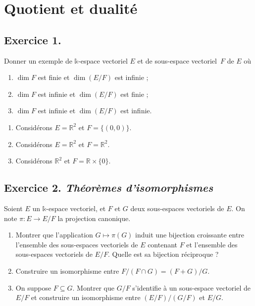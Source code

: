 \documentclass[./main]{subfiles}
\begin{document}
  \chapter{Quotient et dualité}
  \minitoc

  \section{Exercice 1.}
  \begin{enonce}
    Donner un exemple de $\mathds{k}$-espace vectoriel $E$ et de sous-espace vectoriel~$F$ de $E$ où
    \begin{enumerate}
      \item $\dim F$ est finie et  $\dim(E / F)$ est infinie ;
      \item $\dim F$ est infinie et  $\dim(E / F)$ est finie ;
      \item $\dim F$ est infinie et  $\dim(E / F)$ est infinie.
    \end{enumerate}
  \end{enonce}
  \begin{enumerate}
    \item Considérons $E = \mathds{R}^2$ et $F = \{(0,0)\}$.
    \item Considérons $E = \mathds{R}^2$ et $F = \mathds{R}^2$.
    \item Considérons $\mathds{R}^2$ et $F = \mathds{R} \times \{0\}$.
  \end{enumerate}

  \section{Exercice 2. \textit{Théorèmes d'isomorphismes}}
  \begin{enonce}
    Soient $E$ un $\mathds{k}$-espace vectoriel, et $F$ et $G$ deux sous-espaces vectoriels de $E$.
    On note $\pi : E \to E / F$ la projection canonique.
    \begin{enumerate}
      \item Montrer que l'application $G \mapsto \pi(G)$ induit une bijection croissante entre l'ensemble des sous-espaces vectoriels de $E$ contenant $F$ et l'ensemble des sous-espaces vectoriels de $E / F$. Quelle est sa bijection réciproque ?
      \item Construire un isomorphisme entre $F / (F \cap G) = (F + G) / G$.
      \item On suppose $F \subseteq G$. Montrer que $G / F$ s'identifie à un sous-espace vectoriel de $E / F$ et construire un isomorphisme entre $(E / F) / (G / F)$ et $E / G$.
    \end{enumerate}
  \end{enonce}
\end{document}
